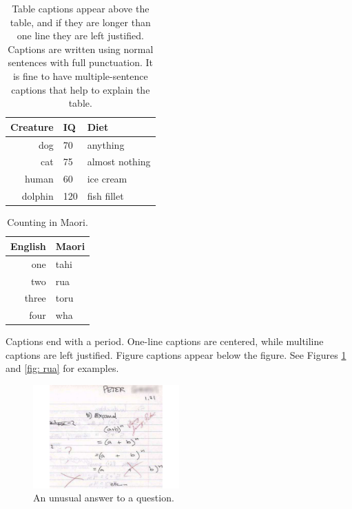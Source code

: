 \documentclass{wscpaperproc}
\theoremstyle{wsc}
\begin{document}
\begin{table}[htb]
\centering
\caption{Table captions appear above the table, and if they are longer than one line they are left justified. Captions are written using normal sentences with full punctuation. It is fine to have multiple-sentence captions that help to explain the table.\label{tab: first}}
\begin{tabular}{rll}
\hline
Creature & IQ & Diet\\ \hline
dog & 70 & anything\\
cat & 75 & almost nothing\\
human & 60 & ice cream \\
dolphin & 120 & fish fillet\\
\hline
\end{tabular}
\end{table}

\begin{table}[htb]
\centering
\caption{Counting in Maori.\label{tab: second}}
\begin{tabular}{r|l}
English & Maori \\ \hline
one & tahi \\
two & rua \\
three & toru \\
four & wha \\
\end{tabular}
\end{table}
 
Captions end with a period. 
One-line captions are centered,
while multiline captions are left justified. Figure captions appear below the figure. 
See Figures \ref{fig: tahi} and \ref{fig: rua} for examples.

\begin{figure}[htb]
{
\centering
\includegraphics[width=0.50\textwidth]{MathExpandExpression}
\caption{An unusual answer to a question.\label{fig: tahi}}
}
\end{figure}
\end{document}
